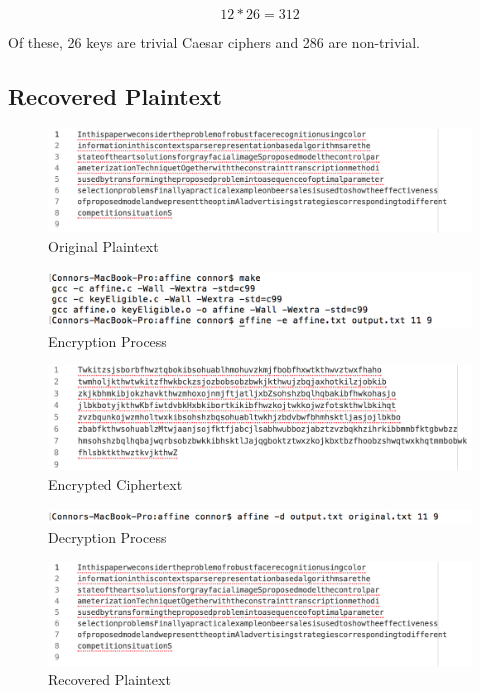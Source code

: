 \documentclass[]{article}
\begin{document}
$$12*26=312$$

Of these, 26 keys are trivial Caesar ciphers and 286 are non-trivial.

\subsection*{Recovered Plaintext}

\begin{figure}[H]
	\includegraphics[width=\textwidth]{affine_plaintext.png}
	\caption{Original Plaintext}
	\centering
\end{figure}

\begin{figure}[H]
	\includegraphics[width=\textwidth]{affine_encrypt.png}
	\caption{Encryption Process}
	\centering
\end{figure}

\begin{figure}[H]
	\includegraphics[width=\textwidth]{affine_ciphertext.png}
	\caption{Encrypted Ciphertext}
	\centering
\end{figure}

\begin{figure}[H]
	\includegraphics[width=\textwidth]{affine_decrypt.png}
	\caption{Decryption Process}
	\centering
\end{figure}

\begin{figure}[H]
	\includegraphics[width=\textwidth]{affine_plaintext.png}
	\caption{Recovered Plaintext}
	\centering
\end{figure}
\end{document}
